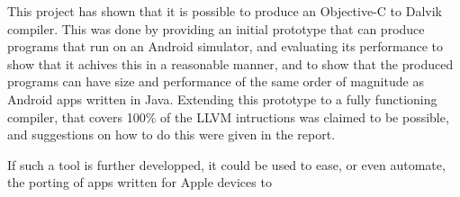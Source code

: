 \documentclass[parskip]{cs4rep}
\begin{document}
This project has shown that it is possible to produce an Objective-C to Dalvik compiler. This was done by providing an initial prototype that can produce programs that run on an Android simulator, and evaluating its performance to show that it achives this in a reasonable manner, and to show that the produced programs can have size and performance of the same order of magnitude as Android apps written in Java. Extending this prototype to a fully functioning compiler, that covers 100\% of the LLVM intructions was claimed to be possible, and suggestions on how to do this were given in the report.

If such a tool is further developped, it could be used to ease, or even automate, the porting of apps written for Apple devices to 





\end{document}

